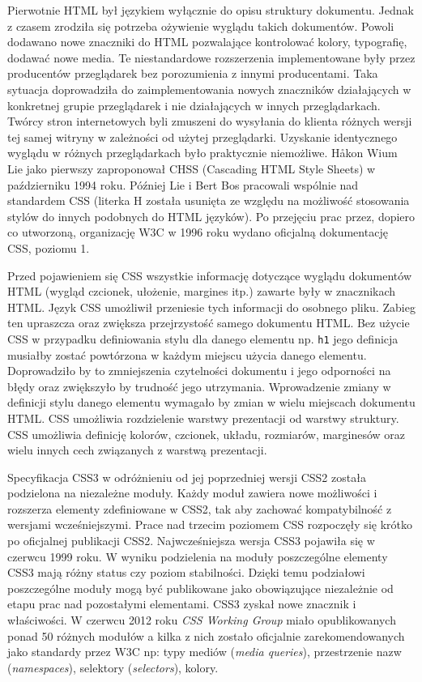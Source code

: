 Pierwotnie HTML był językiem wyłącznie do opisu struktury dokumentu. Jednak z czasem zrodziła się potrzeba ożywienie wyglądu takich dokumentów. Powoli dodawano nowe znaczniki do HTML pozwalające kontrolować kolory, typografię, dodawać nowe media. Te niestandardowe rozszerzenia implementowane były przez producentów przeglądarek bez porozumienia z innymi producentami. Taka sytuacja doprowadziła do zaimplementowania nowych znaczników działających w konkretnej grupie przeglądarek i nie działających w innych przeglądarkach. Twórcy stron internetowych byli zmuszeni do wysyłania do klienta różnych wersji tej samej witryny w zależności od użytej przeglądarki. Uzyskanie identycznego wyglądu w różnych przeglądarkach było praktycznie niemożliwe. Håkon Wium Lie jako pierwszy zaproponował CHSS (Cascading HTML Style Sheets) w październiku 1994 roku. Później Lie i Bert Bos pracowali wspólnie nad standardem CSS (literka H została usunięta ze względu na możliwość stosowania stylów do innych podobnych do HTML języków). Po przejęciu prac przez, dopiero co utworzoną, organizację W3C w 1996 roku wydano oficjalną dokumentację CSS, poziomu 1\cite{cssWiki}.

Przed pojawieniem się CSS wszystkie informację dotyczące wyglądu dokumentów HTML (wygląd czcionek, ułożenie, margines itp.) zawarte były w znacznikach HTML. Język CSS umożliwił przeniesie tych informacji do osobnego pliku. Zabieg ten upraszcza oraz zwiększa przejrzystość samego dokumentu HTML. Bez użycie CSS w przypadku definiowania stylu dla danego elementu np. \verb|h1| jego definicja musiałby zostać powtórzona w każdym miejscu użycia danego elementu. Doprowadziło by to zmniejszenia czytelności dokumentu i jego odporności na błędy oraz zwiększyło by trudność jego utrzymania. Wprowadzenie zmiany w definicji stylu danego elementu wymagało by zmian w wielu miejscach dokumentu HTML. CSS umożliwia rozdzielenie warstwy prezentacji od warstwy struktury. CSS umożliwia definicję kolorów, czcionek, układu, rozmiarów, marginesów oraz wielu innych cech związanych z warstwą prezentacji.

Specyfikacja CSS3 w odróżnieniu od jej poprzedniej wersji CSS2 została podzielona na niezależne moduły. Każdy moduł zawiera nowe możliwości i rozszerza elementy zdefiniowane w CSS2, tak aby zachować kompatybilność z wersjami wcześniejszymi. Prace nad trzecim poziomem CSS rozpoczęły się krótko po oficjalnej publikacji CSS2. Najwcześniejsza wersja CSS3 pojawiła się w czerwcu 1999 roku. W wyniku podzielenia na moduły poszczególne elementy CSS3 mają różny status czy poziom stabilności. Dzięki temu podziałowi poszczególne moduły mogą być publikowane jako obowiązujące niezależnie od etapu prac nad pozostałymi elementami. CSS3 zyskał nowe znacznik i właściwości. W czerwcu 2012 roku \emph{CSS Working Group} miało opublikowanych ponad 50 różnych modułów a kilka z nich zostało oficjalnie zarekomendowanych jako standardy przez W3C np: typy mediów (\textit{media queries}), przestrzenie nazw (\textit{namespaces}), selektory (\textit{selectors}), kolory\cite{cssWiki}.

